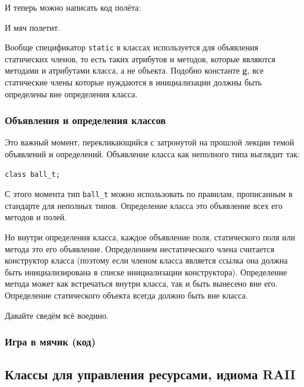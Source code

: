 \documentclass[a4paper,12pt,oneside]{article}
\begin{document}


И теперь можно написать код полёта:



И мяч полетит. 

Вообще спецификатор \lstinline!static! в классах используется для объявления статических членов, то есть таких атрибутов и методов, которые являются методами и атрибутами класса, а не объекта. Подобно константе \textbf{g}, все статические члены которые нуждаются в инициализации должны быть определены вне определения класса.

\subsubsection{Объявления и определения классов}

Это важный момент, перекликающийся с затронутой на прошлой лекции темой объявлений и определений. Объявление класса как неполного типа выглядит так:

\begin{lstlisting}
class ball_t;
\end{lstlisting}

С этого момента тип \lstinline!ball_t! можно использовать по правилам, прописанным в стандарте для неполных типов. Определение класса это объявление всех его методов и полей.

Но внутри определения класса, каждое объявление поля, статического поля или метода это его объявление. Определением нестатического члена считается конструктор класса (поэтому если членом класса является ссылка она должна быть инициализирована в списке инициализации конструктора). Определение метода может как встречаться внутри класса, так и быть вынесено вне его. Определение статического объекта всегда должно быть вне класса.

Давайте сведём всё воедино.

\subsubsection{Игра в мячик (код)}\label{BallGame}



\subsection{Классы для управления ресурсами, идиома RAII}\label{RAII}
\end{document}
